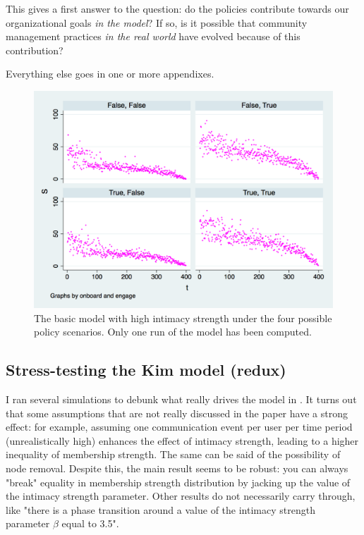 \documentclass{article}
\begin{document}
This gives a first answer to the question: do the policies contribute towards our organizational goals \textit{in the model}? If so, is it possible that community management practices \textit{in the real world} have evolved because of this contribution?

Everything else goes in one or more appendixes.  

\begin{figure}
	\includegraphics[width = \textwidth]{no_node_removal.png} 
	\caption{The basic model with high intimacy strength under the four possible policy scenarios. Only one run of the model has been computed.}
	\label{fig:noNodeRemoval}
\end{figure}

\subsection{Stress-testing the Kim model (redux)}

I ran several simulations to debunk what really drives the model in \cite{kim2015group}. It turns out that some assumptions that are not really discussed in the paper have a strong effect: for example, assuming one communication event per user per time period (unrealistically high) enhances the effect of intimacy strength, leading to a higher inequality of membership strength. The same can be said of the possibility of node removal. Despite this, the main result seems to be robust: you can always "break" equality in membership strength distribution by jacking up the value of the intimacy strength parameter. Other results do not necessarily carry through, like "there is a phase transition around a value of the intimacy strength parameter $\beta$ equal to 3.5".
\end{document}
